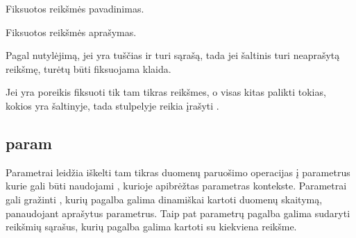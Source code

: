 \documentclass[letterpaper,10pt,lithuanian]{sphinxmanual}
\begin{document}

\begin{fulllineitems}
\label{\detokenize{dimensijos:enum.title}}
\pysigstartsignatures
{}
\pysigstopsignatures
\sphinxAtStartPar
Fiksuotos reikšmės pavadinimas.

\end{fulllineitems}


\begin{fulllineitems}
\label{\detokenize{dimensijos:enum.description}}
\pysigstartsignatures
{}
\pysigstopsignatures
\sphinxAtStartPar
Fiksuotos reikšmės aprašymas.

\end{fulllineitems}


\sphinxAtStartPar
Pagal nutylėjimą, jei {\hyperref[\detokenize{dimensijos:property.prepare}]{}} yra tuščias ir {\hyperref[\detokenize{formatas:property}]{}}
turi {\hyperref[\detokenize{dimensijos:enum}]{}} sąrašą, tada jei šaltinis turi neaprašytą reikšmę, turėtų
būti fiksuojama klaida.

\sphinxAtStartPar
Jei yra poreikis fiksuoti tik tam tikras reikšmes, o visas kitas palikti tokias,
kokios yra šaltinyje, tada {\hyperref[\detokenize{dimensijos:property.prepare}]{}} stulpelyje reikia įrašyti
.


\subsection{param}
\label{\detokenize{dimensijos:param}}\label{\detokenize{dimensijos:id11}}\label{\detokenize{dimensijos:module-param}}
\sphinxAtStartPar
Parametrai leidžia iškelti tam tikras duomenų paruošimo operacijas į parametrus
kurie gali būti naudojami {\hyperref[\detokenize{dimensijos:dimensijos}]{}}, kurioje apibrėžtas parametras
kontekste. Parametrai gali gražinti {\hyperref[\detokenize{savokos:term-iteratorius}]{}}, kurių pagalba galima
dinamiškai kartoti {\hyperref[\detokenize{formatas:resource}]{}} duomenų skaitymą, panaudojant aprašytus
parametrus. Taip pat parametrų pagalba galima sudaryti reikšmių sąrašus, kurių
pagalba galima kartoti {\hyperref[\detokenize{formatas:resource}]{}} su kiekviena reikšme.
\end{document}
